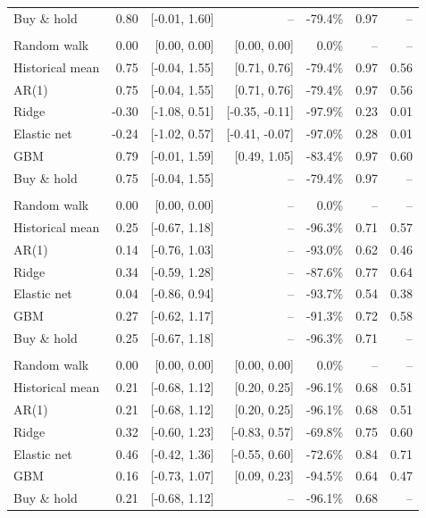 \begin{tabular}{lrrrrrr}
\quad Buy \& hold & 0.80 & [-0.01, 1.60] & -- & -79.4\% & 0.97 & -- \\
\addlinespace
\multicolumn{7}{l}{\emph{ETH, $h=7$}} \\
\quad Random walk & 0.00 & [0.00, 0.00] & [0.00, 0.00] & 0.0\% & -- & -- \\
\quad Historical mean & 0.75 & [-0.04, 1.55] & [0.71, 0.76] & -79.4\% & 0.97 & 0.56 \\
\quad AR(1) & 0.75 & [-0.04, 1.55] & [0.71, 0.76] & -79.4\% & 0.97 & 0.56 \\
\quad Ridge & -0.30 & [-1.08, 0.51] & [-0.35, -0.11] & -97.9\% & 0.23 & 0.01 \\
\quad Elastic net & -0.24 & [-1.02, 0.57] & [-0.41, -0.07] & -97.0\% & 0.28 & 0.01 \\
\quad GBM & 0.79 & [-0.01, 1.59] & [0.49, 1.05] & -83.4\% & 0.97 & 0.60 \\
\quad Buy \& hold & 0.75 & [-0.04, 1.55] & -- & -79.4\% & 0.97 & -- \\
\addlinespace
\multicolumn{7}{l}{\emph{SOL, $h=1$}} \\
\quad Random walk & 0.00 & [0.00, 0.00] & -- & 0.0\% & -- & -- \\
\quad Historical mean & 0.25 & [-0.67, 1.18] & -- & -96.3\% & 0.71 & 0.57 \\
\quad AR(1) & 0.14 & [-0.76, 1.03] & -- & -93.0\% & 0.62 & 0.46 \\
\quad Ridge & 0.34 & [-0.59, 1.28] & -- & -87.6\% & 0.77 & 0.64 \\
\quad Elastic net & 0.04 & [-0.86, 0.94] & -- & -93.7\% & 0.54 & 0.38 \\
\quad GBM & 0.27 & [-0.62, 1.17] & -- & -91.3\% & 0.72 & 0.58 \\
\quad Buy \& hold & 0.25 & [-0.67, 1.18] & -- & -96.3\% & 0.71 & -- \\
\addlinespace
\multicolumn{7}{l}{\emph{SOL, $h=7$}} \\
\quad Random walk & 0.00 & [0.00, 0.00] & [0.00, 0.00] & 0.0\% & -- & -- \\
\quad Historical mean & 0.21 & [-0.68, 1.12] & [0.20, 0.25] & -96.1\% & 0.68 & 0.51 \\
\quad AR(1) & 0.21 & [-0.68, 1.12] & [0.20, 0.25] & -96.1\% & 0.68 & 0.51 \\
\quad Ridge & 0.32 & [-0.60, 1.23] & [-0.83, 0.57] & -69.8\% & 0.75 & 0.60 \\
\quad Elastic net & 0.46 & [-0.42, 1.36] & [-0.55, 0.60] & -72.6\% & 0.84 & 0.71 \\
\quad GBM & 0.16 & [-0.73, 1.07] & [0.09, 0.23] & -94.5\% & 0.64 & 0.47 \\
\quad Buy \& hold & 0.21 & [-0.68, 1.12] & -- & -96.1\% & 0.68 & -- \\
\bottomrule
\end{tabular}
